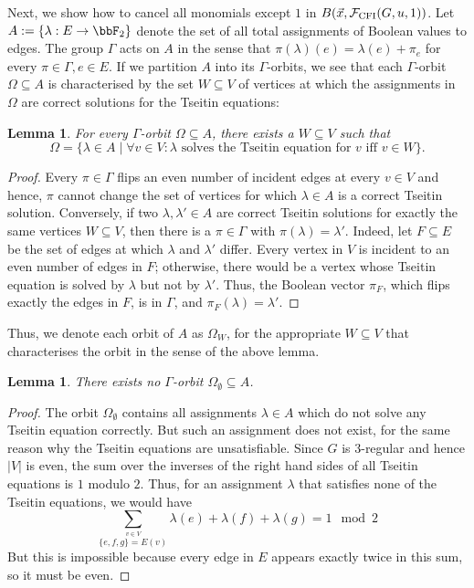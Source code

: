 \documentclass[10pt,a4paper]{article}
\newtheorem{lemma}[theorem]{Lemma}
\newcommand{\Ff}{{\cal F}}
\newcommand{\CFI}{\Ff_{\mathrm{CFI}}}
\begin{document}
Next, we show how to cancel all monomials except $1$ in $B(\vec x, \CFI(G,u,1))$. Let $A := \{ \lambda : E \to \bbF_2\}$ denote the set of all total assignments of Boolean values to edges. The group $\Gamma$ acts on $A$ in the sense that $\pi(\lambda)(e) = \lambda(e)+\pi_e$ for every $\pi \in \Gamma, e \in E$.
If we partition $A$ into its $\Gamma$-orbits, we see that each $\Gamma$-orbit $\Omega \subseteq A$ is characterised by the set $W \subseteq V$ of vertices at which the assignments in $\Omega$ are correct solutions for the Tseitin equations:
\begin{lemma}
	For every $\Gamma$-orbit $\Omega \subseteq A$, there exists a $W \subseteq V$ such that
	\[
	\Omega = \{ \lambda \in A \mid \forall v \in V: \lambda \text{ solves the Tseitin equation for } v \text{ iff } v \in W  \}.
	\]
\end{lemma}
\begin{proof}
	Every $\pi \in \Gamma$ flips an even number of incident edges at every $v \in V$ and hence, $\pi$ cannot change the set of vertices for which $\lambda \in A$ is a correct Tseitin solution. Conversely, if two $\lambda, \lambda' \in A$ 
	are correct Tseitin solutions for exactly the same vertices $W \subseteq V$, then there is a $\pi \in \Gamma$ with $\pi(\lambda) = \lambda'$. Indeed, let $F \subseteq E$ be the set of edges at which $\lambda$ and $\lambda'$ differ. Every vertex in $V$ is incident to an even number of edges in $F$; otherwise, there would be a vertex whose Tseitin equation is solved by $\lambda$ but not by $\lambda'$. Thus, the Boolean vector $\pi_F$, which flips exactly the edges in $F$, is in $\Gamma$, and $\pi_F(\lambda) = \lambda'$.
\end{proof}


Thus, we denote each orbit of $A$ as $\Omega_W$, for the appropriate $W \subseteq V$ that characterises the orbit in the sense of the above lemma.
\begin{lemma}
	\label{lem:noWisEmpty}
	There exists no $\Gamma$-orbit $\Omega_\emptyset \subseteq A$.
\end{lemma}	
\begin{proof}
	The orbit $\Omega_\emptyset$ contains all assignments $\lambda \in A$ which do not solve any Tseitin equation correctly. But such an assignment does not exist, for the same reason why the Tseitin equations are unsatisfiable. Since $G$ is $3$-regular and hence $|V|$ is even, the sum over the inverses of the right hand sides of all Tseitin equations is $1$ modulo $2$. Thus, for an assignment $\lambda$ that satisfies none of the Tseitin equations, we would have \[
	\sum_{\stackrel{v \in V}{\{e,f,g\} = E(v)}} \lambda(e) + \lambda(f) + \lambda(g) = 1 \mod 2
	\] But this is impossible because every edge in $E$ appears exactly twice in this sum, so it must be even.
\end{proof}	
\end{document}
